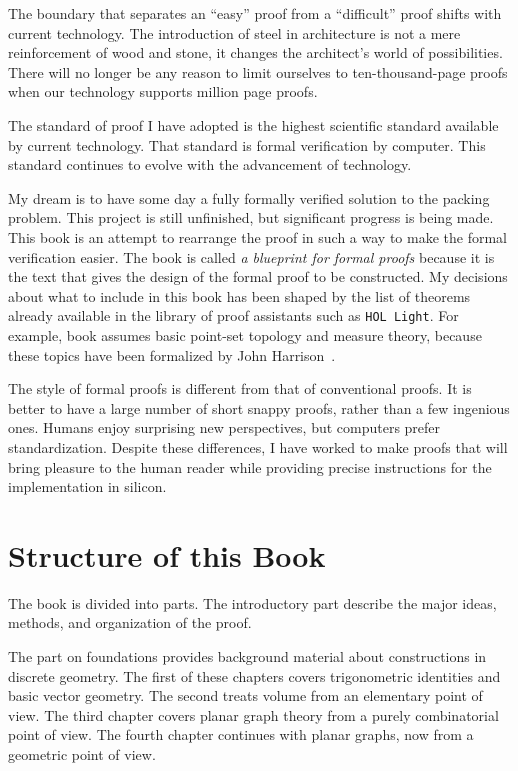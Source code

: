 The boundary that separates an ``easy'' proof from a ``difficult''
proof shifts with current technology.  The introduction of steel in
architecture is not a mere reinforcement of wood and stone, it changes
the architect's world of possibilities.  There will no longer be any
reason to limit ourselves to ten-thousand-page proofs when our
technology supports million page proofs.

The standard of proof I have adopted is the highest scientific standard
available by current technology.  That 
standard is formal verification by computer.  This standard
continues to evolve with the advancement of technology.

My dream is to have some day a fully formally verified solution to the
packing problem.  This project is still unfinished, but significant progress is
being made.  This book is an attempt to rearrange the proof in such a
way to make the formal verification easier.  The book is called {\it a
  blueprint for formal proofs} because it is the text that gives the
design of the formal proof to be constructed.  My decisions about what
to include in this book has been shaped by the list of theorems
already available in the library of proof assistants such as {\tt HOL
  Light}.  For example, book assumes basic point-set topology and
measure theory, because these topics have been formalized by John
Harrison~\cite{unknown}.

The style of formal proofs is different from that of
conventional proofs.  It is better to have a large number of short
snappy proofs, rather than a few ingenious ones.  Humans enjoy
surprising new perspectives, but computers prefer standardization.
Despite these differences, I have worked to make proofs that
will bring pleasure  to the human reader while providing precise instructions
for the implementation in silicon.



\section*{Structure of this Book}

The book is divided into parts.
The introductory part describe the major ideas, methods, and
organization of the proof.  

The part on foundations provides background material about
constructions in discrete geometry.    The first
of these chapters
covers trigonometric identities and basic vector geometry.  The second
treats volume from an elementary point of view.  The third chapter
covers planar graph theory from a purely combinatorial point of view.
The fourth chapter continues with planar graphs, now from a 
geometric point of view.


